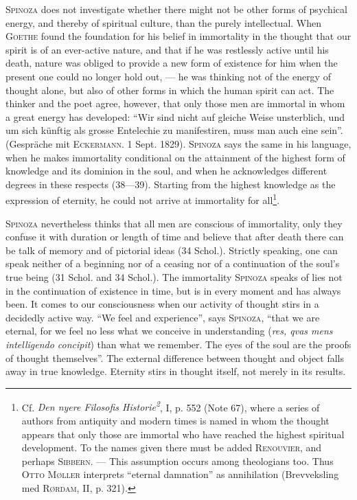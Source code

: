 \documentclass[12pt]{article}
\newcommand{\opage}[1]{\marginnote{\footnotesize\textit{[#1]}}}
\begin{document}
\textsc{Spinoza} does not investigate whether there might not be other forms of psychical energy,
and thereby of spiritual culture, than the purely intellectual. When \textsc{Goethe} found the
foundation for his belief in immortality in the thought that our spirit is of an ever-active
nature, and that if he was restlessly active until his death, nature was obliged to provide a new
form of existence for him when the present one could no longer hold out, --- he was thinking not of
the energy of thought alone, but also of other forms in which the human spirit can act. The thinker
and the poet agree, however, that only those men are immortal in whom a great energy has developed:
``Wir sind nicht auf gleiche Weise unsterblich, und um sich künftig als grosse Entelechie zu
manifestiren, muss man auch eine sein''. (Gespräche mit \textsc{Eckermann}. 1 Sept. 1829).
\textsc{Spinoza} says the same in his language, when he makes immortality conditional on the
attainment of the highest form of knowledge and its dominion in the soul, and when he acknowledges
different degrees in these respects (38---39). Starting from the highest knowledge as the
expression of eternity, he could not arrive at immortality for all\footnote{Cf. \textit{Den nyere
Filosofis Historie\textsuperscript{2}}, I, p. 552 (Note 67), where a series of authors from antiquity
and modern times is named in whom the thought appears that only those are immortal who have reached
the highest spiritual development. To the names given there must be added \textsc{Renouvier}, and
perhaps \textsc{Sibbern}. --- This assumption occurs among theologians too. Thus \textsc{Otto
Møller} interprets ``eternal damnation'' as annihilation (Brevveksling med \textsc{Rørdam}, II, p.
321).}.

\textsc{Spinoza} nevertheless thinks that all men are conscious of immortality, only they confuse it
with duration or length of time and believe that after death there can be talk of memory and of
pictorial ideas (34 Schol.). Strictly speaking, one can speak neither of a beginning nor of a ceasing
nor of a continuation of the soul's true being (31 Schol. and 34 Schol.). The immortality
\textsc{Spinoza} speaks of lies not in the continuation of existence in time, but is in every moment
and has always been. It comes to our consciousness when our activity of thought stirs in a
decidedly active way. ``We feel and experience'', says \textsc{Spinoza}, ``that we are eternal, for
\opage{92}we feel no less what we conceive in understanding (\textit{res, qvas mens intelligendo
concipit}) than what we remember. The eyes of the soul are the proofs of thought themselves''. The
external difference between thought and object falls away in true knowledge. Eternity stirs in
thought itself, not merely in its results.
\end{document}

